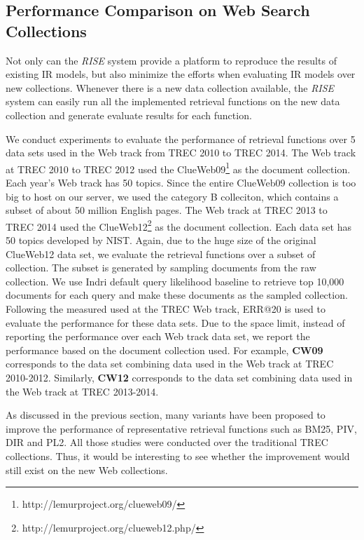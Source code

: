 \subsection{Performance Comparison on Web Search Collections}
\label{sec:more_exp}

Not only can the {\em RISE} system provide a platform to reproduce
the results of existing IR models, but also minimize the efforts
when evaluating IR models over new collections.  Whenever there is 
a new data collection available, the {\em RISE} system can easily 
run all the implemented retrieval functions on the new data collection 
and generate evaluate results for each function. 

We conduct experiments to evaluate the performance of retrieval 
functions over 5 data sets used in the Web track from TREC 2010 
to TREC 2014. The Web track at TREC 2010 to TREC 2012 used 
the ClueWeb09\footnote{http://lemurproject.org/clueweb09/} as 
the document collection.  Each year's Web track has 50 topics. Since the entire
ClueWeb09 collection is too big to host on our server, we used the 
category B colleciton, which contains a subset of about 50 million 
English pages. The Web track at TREC 2013 to TREC 2014 used 
the ClueWeb12\footnote{http://lemurproject.org/clueweb12.php/} 
as the document collection. Each data set has 50 topics developed 
by NIST.  Again, due to the huge size of the original ClueWeb12 
data set, we evaluate the retrieval functions over a subset 
of collection.  The subset is generated by sampling documents from the raw collection. We use Indri default 
query likelihood baseline to retrieve top 10,000 documents for each 
query and make these documents as the sampled collection. 
Following the measured used at the TREC Web track, ERR@20 is 
used to evaluate the performance for these data sets. 
Due to the space limit, instead of reporting the performance over
each Web track data set, we report the performance based on the 
document collection used. For example, \textbf{CW09} corresponds to 
the data set combining data used in the Web track at TREC 2010-2012. 
Similarly, \textbf{CW12} corresponds to the data set combining 
data used in the Web track at TREC 2013-2014. 

As discussed in the previous section, many variants have been 
proposed to improve the performance of representative retrieval 
functions such as BM25, PIV, DIR and PL2.  All those studies 
were conducted over the traditional TREC collections. Thus, it would 
be interesting to see whether the improvement would still exist 
on the new Web collections. 

